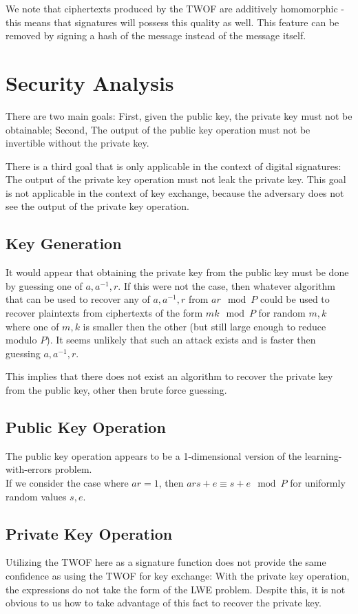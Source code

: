 \documentclass[preprint]{iacrtrans}
\begin{document}
We note that ciphertexts produced by the TWOF are additively homomorphic - this means that signatures will possess this quality as well. This feature can be removed by signing a hash of the message instead of the message itself.

\section{Security Analysis}
There are two main goals: First, given the public key, the private key must not be obtainable; Second, The output of the public key operation must not be invertible without the private key.

There is a third goal that is only applicable in the context of digital signatures: The output of the private key operation must not leak the private key. This goal is not applicable in the context of key exchange, because the adversary does not see the output of the private key operation.

\subsection{Key Generation}
It would appear that obtaining the private key from the public key must be done by guessing one of $a, a^{-1}, r$. If this were not the case, then whatever algorithm that can be used to recover any of $a, a^{-1}, r$ from $a r \mod P$ could be used to recover plaintexts from ciphertexts of the form $m k \mod P$ for random $m, k$ where one of $m, k$ is smaller then the other (but still large enough to reduce modulo $P$). It seems unlikely that such an attack exists and is faster then guessing $a, a^{-1},  r$. 

This implies that there does not exist an algorithm to recover the private key from the public key, other then brute force guessing.

\subsection{Public Key Operation}
The public key operation appears to be a 1-dimensional version of the learning-with-errors problem.\\

If we consider the case where $ar = 1$, then $ars + e \equiv s + e \mod P$ for uniformly random values $s, e$. 

\subsection{Private Key Operation}
Utilizing the TWOF here as a signature function does not provide the same confidence as using the TWOF for key exchange: With the private key operation, the expressions do not take the form of the LWE problem. Despite this, it is not obvious to us how to take advantage of this fact to recover the private key.
\end{document}
